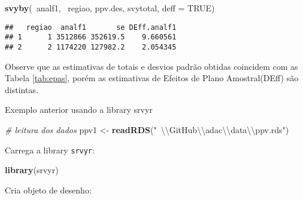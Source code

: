 \documentclass[]{book}
\newenvironment{Shaded}{\begin{snugshade}}{\end{snugshade}}
\newcommand{\KeywordTok}[1]{\textcolor[rgb]{0.13,0.29,0.53}{\textbf{{#1}}}}
\newcommand{\DataTypeTok}[1]{\textcolor[rgb]{0.13,0.29,0.53}{{#1}}}
\newcommand{\CharTok}[1]{\textcolor[rgb]{0.31,0.60,0.02}{{#1}}}
\newcommand{\StringTok}[1]{\textcolor[rgb]{0.31,0.60,0.02}{{#1}}}
\newcommand{\CommentTok}[1]{\textcolor[rgb]{0.56,0.35,0.01}{\textit{{#1}}}}
\newcommand{\OtherTok}[1]{\textcolor[rgb]{0.56,0.35,0.01}{{#1}}}
\newcommand{\NormalTok}[1]{{#1}}
\theoremstyle{definition}
\theoremstyle{definition}
\theoremstyle{remark}
\let\BeginKnitrBlock\begin \let\EndKnitrBlock\end
\begin{document}
\begin{Shaded}
\begin{Highlighting}[]
\KeywordTok{svyby}\NormalTok{(~analf1, ~regiao, ppv.des, svytotal, }\DataTypeTok{deff =} \OtherTok{TRUE}\NormalTok{)}
\end{Highlighting}
\end{Shaded}

\begin{verbatim}
##   regiao  analf1       se DEff.analf1
## 1      1 3512866 352619.5    9.660561
## 2      2 1174220 127982.2    2.054345
\end{verbatim}

Observe que as estimativas de totais e desvios padrão obtidas coincidem
com as Tabela \ref{tab:epas}, porém as estimativas de Efeitos de Plano
Amostral(DEff) são distintas.

\BeginKnitrBlock{example}
\protect\hypertarget{ex:unnamed-chunk-9}{}{\label{ex:unnamed-chunk-9}}Exemplo
anterior usando a library srvyr
\EndKnitrBlock{example}

\begin{Shaded}
\begin{Highlighting}[]
\CommentTok{# leitura dos dados}
\NormalTok{ppv1 <-}\StringTok{ }\KeywordTok{readRDS}\NormalTok{(}\StringTok{"~}\CharTok{\textbackslash{}\textbackslash{}}\StringTok{GitHub}\CharTok{\textbackslash{}\textbackslash{}}\StringTok{adac}\CharTok{\textbackslash{}\textbackslash{}}\StringTok{data}\CharTok{\textbackslash{}\textbackslash{}}\StringTok{ppv.rds"}\NormalTok{)}
\end{Highlighting}
\end{Shaded}

Carrega a library \texttt{srvyr}:

\begin{Shaded}
\begin{Highlighting}[]
\KeywordTok{library}\NormalTok{(srvyr)}
\end{Highlighting}
\end{Shaded}

Cria objeto de desenho:

\begin{Shaded}
\end{Shaded}
\end{document}
